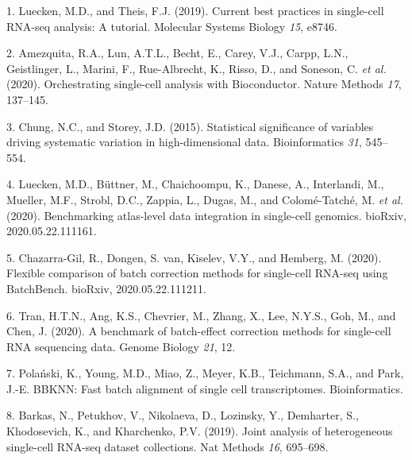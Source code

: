 \documentclass[
]{article}
\newenvironment{cslreferences}%
  {}%
  {\par}
\begin{document}
\hypertarget{refs}{}
\begin{cslreferences}
\leavevmode\hypertarget{ref-lueckenCurrentBestPractices2019}{}%
1. Luecken, M.D., and Theis, F.J. (2019). Current best practices in single-cell RNA-seq analysis: A tutorial. Molecular Systems Biology \emph{15}, e8746.

\leavevmode\hypertarget{ref-amezquitaOrchestratingSinglecellAnalysis2020}{}%
2. Amezquita, R.A., Lun, A.T.L., Becht, E., Carey, V.J., Carpp, L.N., Geistlinger, L., Marini, F., Rue-Albrecht, K., Risso, D., and Soneson, C. \emph{et al.} (2020). Orchestrating single-cell analysis with Bioconductor. Nature Methods \emph{17}, 137--145.

\leavevmode\hypertarget{ref-chungStatisticalSignificanceVariables2015}{}%
3. Chung, N.C., and Storey, J.D. (2015). Statistical significance of variables driving systematic variation in high-dimensional data. Bioinformatics \emph{31}, 545--554.

\leavevmode\hypertarget{ref-lueckenBenchmarkingAtlaslevelData2020}{}%
4. Luecken, M.D., Büttner, M., Chaichoompu, K., Danese, A., Interlandi, M., Mueller, M.F., Strobl, D.C., Zappia, L., Dugas, M., and Colomé-Tatché, M. \emph{et al.} (2020). Benchmarking atlas-level data integration in single-cell genomics. bioRxiv, 2020.05.22.111161.

\leavevmode\hypertarget{ref-chazarra-gilFlexibleComparisonBatch2020}{}%
5. Chazarra-Gil, R., Dongen, S. van, Kiselev, V.Y., and Hemberg, M. (2020). Flexible comparison of batch correction methods for single-cell RNA-seq using BatchBench. bioRxiv, 2020.05.22.111211.

\leavevmode\hypertarget{ref-tranBenchmarkBatcheffectCorrection2020}{}%
6. Tran, H.T.N., Ang, K.S., Chevrier, M., Zhang, X., Lee, N.Y.S., Goh, M., and Chen, J. (2020). A benchmark of batch-effect correction methods for single-cell RNA sequencing data. Genome Biology \emph{21}, 12.

\leavevmode\hypertarget{ref-polanskiBBKNNFastBatch}{}%
7. Polański, K., Young, M.D., Miao, Z., Meyer, K.B., Teichmann, S.A., and Park, J.-E. BBKNN: Fast batch alignment of single cell transcriptomes. Bioinformatics.

\leavevmode\hypertarget{ref-barkasJointAnalysisHeterogeneous2019}{}%
8. Barkas, N., Petukhov, V., Nikolaeva, D., Lozinsky, Y., Demharter, S., Khodosevich, K., and Kharchenko, P.V. (2019). Joint analysis of heterogeneous single-cell RNA-seq dataset collections. Nat Methods \emph{16}, 695--698.


\end{cslreferences}
\end{document}

